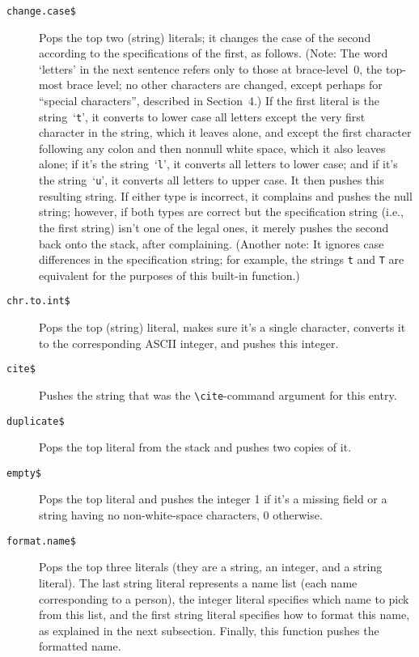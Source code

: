 \begin{description}
\item[\hbox{\tt change.case\$}\hfill]
Pops the top two (string) literals;
it changes the case of the second according to the
specifications of the first, as follows.  (Note: The word `letters' in
the next sentence refers only to those at brace-level~0, the top-most
brace level; no other characters are changed, except perhaps for
``special characters''$\!$, described in Section~4.)
If the first literal is the
string~`{\tt t}'$\!$, it converts to lower case all letters except the very
first character in the string, which it leaves alone, and except the
first character following any colon and then nonnull white space,
which it also leaves alone; if it's the string~`{\tt l}'$\!$, it converts all
letters to lower case; and if it's the string~`{\tt u}'$\!$, it converts all
letters to upper case.
It then pushes this resulting string.  If either
type is incorrect, it complains and pushes the null string; however,
if both types are correct but the specification string (i.e., the
first string) isn't one of the legal ones, it merely pushes the second
back onto the stack, after complaining.  (Another note: It ignores
case differences in the specification string; for example, the strings
{\tt t} and {\tt T} are equivalent for the purposes of this built-in
function.)

\item[\hbox{\tt chr.to.int\$}\hfill]
Pops the top (string) literal,
makes sure it's a single character, converts it to the
corresponding ASCII integer, and pushes this integer.

\item[\hbox{\tt cite\$}\hfill]
Pushes the string that was the
\hbox{\verb|\cite|}-command argument for this entry.

\item[\hbox{\tt duplicate\$}\hfill]
Pops the top literal from the stack and pushes two copies of it.

\item[\hbox{\tt empty\$}\hfill]
Pops the top literal and pushes
the integer 1 if it's a missing field or a string having no
non-white-space characters, 0 otherwise.

\item[\hbox{\tt format.name\$}\hfill]
Pops the top three literals
(they are a string, an integer, and a string literal).
The last string literal represents a name list (each name
corresponding to a person), the integer literal specifies which name
to pick from this list, and the first string literal specifies how to
format this name, as explained in the next subsection.
Finally, this function pushes the formatted name.


\end{description}
